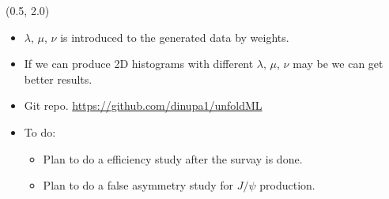 \documentclass[10pt, xcolor={dvipsnames}, aspectratio = 169, sans,mathserif]{beamer}
\begin{document}
\begin{frame}

\begin{textblock}{15.0}(0.5, 2.0)
\begin{itemize}

    \item $\lambda$, $\mu$, $\nu$ is introduced to the generated data by weights.

    \item If we can produce 2D histograms with different $\lambda$, $\mu$, $\nu$ may be we can get better results.

    \item Git repo. \url{https://github.com/dinupa1/unfoldML}

    \item To do:

    \begin{itemize}

        \item Plan to do a efficiency study after the survay is done.

        \item Plan to do a false asymmetry study for $J/\psi$ production.
    \end{itemize}

\end{itemize}
\end{textblock}

\end{frame}
\end{document}
